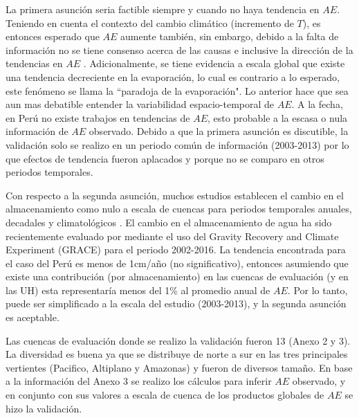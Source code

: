 \documentclass[12pt]{article}
\begin{document}
La primera asunción seria factible siempre y cuando no haya tendencia en $AE$. Teniendo en cuenta el contexto del cambio climático (incremento de $T$), es entonces esperado que $AE$ aumente también, sin embargo, debido a la falta de información no se tiene consenso acerca de las causas e inclusive la dirección de la tendencias en $AE$ \citep{hobbins2004trends,cong2009does,wang2011trends,miralles2016wacmos,douville2013anthropogenic,zhang2016multi}. Adicionalmente, se tiene evidencia a escala global que existe una tendencia decreciente en la evaporación, lo cual es contrario a lo esperado, este fenómeno se llama la “paradoja de la evaporación". Lo anterior hace que sea aun mas debatible entender la variabilidad espacio-temporal de $AE$. A la fecha, en Perú no existe trabajos en tendencias de $AE$, esto probable a la escasa o nula información de $AE$ observado. Debido a que la primera asunción es discutible, la validación solo se realizo en un periodo común de información (2003-2013) por lo que efectos de tendencia fueron aplacados y porque no se comparo en otros periodos temporales.

Con respecto a la segunda asunción, muchos estudios establecen el cambio en el almacenamiento como nulo a escala de cuencas para periodos temporales anuales, decadales y climatológicos \citep{Budyko1961,Fu1981,Zhang2008,Wang2014,Singh2015}. El cambio en el almacenamiento de agua ha sido recientemente evaluado por \citet{rodell2018emerging} mediante el uso del Gravity Recovery and Climate Experiment (GRACE) para el periodo 2002-2016. La tendencia encontrada para el caso del Perú es menos de 1cm/año (no significativo), entonces asumiendo que existe una contribución (por almacenamiento) en las cuencas de evaluación (y en las UH) esta representaría menos del 1\% al promedio anual de $AE$. Por lo tanto, puede ser simplificado a la escala del estudio (2003-2013), y la segunda asunción es aceptable.



\clearpage
Las cuencas de evaluación donde se realizo la validación fueron 13 (Anexo 2 y 3). La diversidad es buena ya que se distribuye de norte a sur en las tres principales vertientes (Pacifico, Altiplano y Amazonas) y fueron de diversos tamaño. En base a la información del Anexo 3 se realizo los cálculos para inferir $AE$ observado, y en conjunto con sus valores a escala de cuenca de los productos globales de $AE$ se hizo la validación. 
\end{document}
